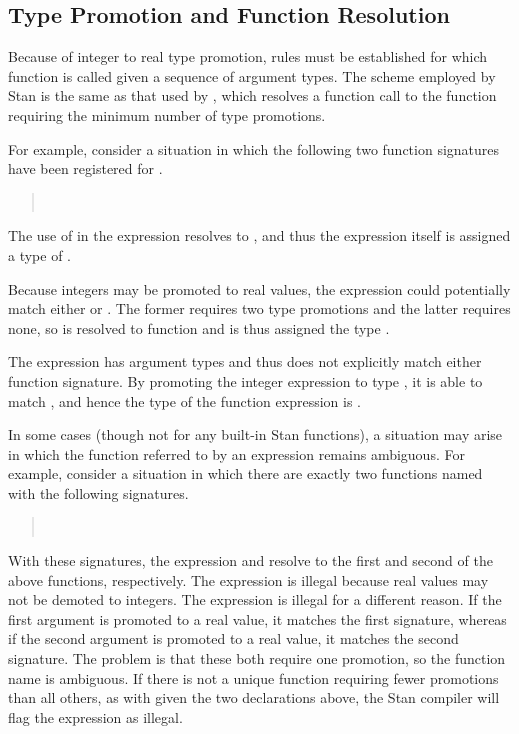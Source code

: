 \subsection{Type Promotion and Function Resolution}

Because of integer to real type promotion, rules must be established
for which function is called given a sequence of argument types.  The
scheme employed by Stan is the same as that used by \Cpp, which
resolves a function call to the function requiring the minimum number
of type promotions.  

For example, consider a situation in which the following two function
signatures have been registered for .
%
\begin{quote}
\\
\end{quote}
%
The use of  in the expression  resolves
to , and thus the expression 
itself is assigned a type of .  

Because integers may be promoted to real values, the expression
 could potentially match either 
or .  The former requires two type promotions and
the latter requires none, so  is resolved to function
 and is thus assigned the type .

The expression  has argument types 
and thus does not explicitly match either function signature.  By
promoting the integer expression  to type , it is
able to match , and hence the type of the
function expression  is .

In some cases (though not for any built-in Stan functions), a
situation may arise in which the function referred to by an
expression remains ambiguous.  For example, consider a situation in
which there are exactly two functions named  with the
following signatures.
%
\begin{quote}
\\
\end{quote}
%
With these signatures, the expression  and
 resolve to the first and second of the above
functions, respectively.  The expression  is
illegal because real values may not be demoted to integers.  The
expression  is illegal for a different reason.  If the
first argument is promoted to a real value, it matches the first
signature, whereas if the second argument is promoted to a real value,
it matches the second signature.  The problem is that these both
require one promotion, so the function name  is ambiguous.
If there is not a unique function requiring fewer promotions than all
others, as with  given the two declarations above, 
the Stan compiler will flag the expression as illegal. 


